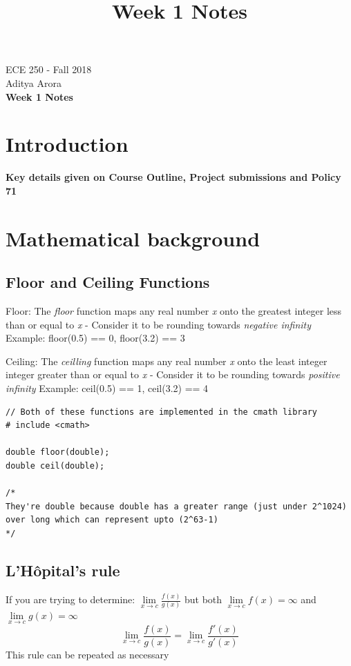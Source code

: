 \documentclass[11pt]{article}
\theoremstyle{definition}
\begin{document}
\title{Week 1 Notes}
\thispagestyle{empty}

\begin{center}
{\vspace{5mm} \LARGE ECE 250 - Fall 2018 \\ \vspace{5mm}Aditya Arora}\\
{\vspace{5mm} \LARGE \bf Week 1 Notes}

\end{center}
\section{Introduction}

\textbf{Key details given on Course Outline, Project submissions and Policy 71}

\section{Mathematical background}
\subsection{Floor and Ceiling Functions}
Floor: The \textit{floor} function maps any real number \textit{x} onto the greatest integer less than or equal to \textit{x} 
\newline
- Consider it to be rounding towards \textit{negative infinity}
Example: floor(0.5) == 0, floor(3.2) == 3

Ceiling: The \textit{ceilling} function maps any real number \textit{x} onto the least integer integer greater than or equal to \textit{x} 
\newline
- Consider it to be rounding towards \textit{positive infinity}
Example: ceil(0.5) == 1, ceil(3.2) == 4
\newline
\begin{lstlisting}
// Both of these functions are implemented in the cmath library
# include <cmath>

double floor(double);
double ceil(double);

/*
They're double because double has a greater range (just under 2^1024) 
over long which can represent upto (2^63-1)
*/
\end{lstlisting}

\subsection{L’Hôpital’s rule}
If you are trying to determine: $\mathop {\lim }\limits_{x \to c} \frac{{f\left(x \right)}}{{g\left(x \right)}}$
but both $\mathop {\lim }\limits_{x \to c}{f\left(x \right)} = \infty$ and $\mathop {\lim }\limits_{x \to c}{g\left(x \right)} = \infty$
$$\mathop {\lim }\limits_{x \to c} \frac{{f\left(x \right)}}{{g\left(x \right)}} = \mathop {\lim }\limits_{x \to c} \frac{{f'\left(x \right)}}{{g'\left(x \right)}}$$
This rule can be repeated as necessary
\end{document}
